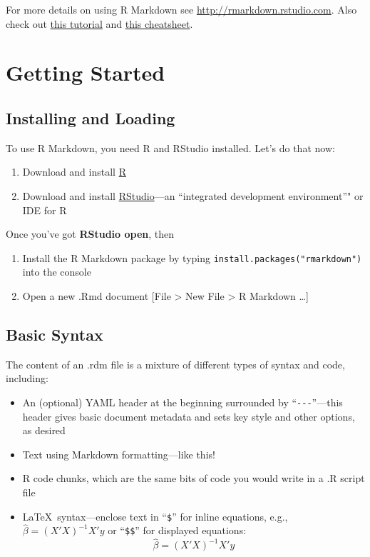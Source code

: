 \documentclass[11pt,]{article}
\providecommand{\tightlist}{%
  \setlength{\itemsep}{0pt}\setlength{\parskip}{0pt}}
\begin{document}
For more details on using R Markdown see
\url{http://rmarkdown.rstudio.com}. Also check out
\href{http://rmarkdown.rstudio.com/lesson-1.html}{this tutorial} and
\href{https://www.rstudio.com/wp-content/uploads/2016/03/rmarkdown-cheatsheet-2.0.pdf}{this
cheatsheet}.

\hypertarget{getting-started}{%
\section{Getting Started}\label{getting-started}}

\hypertarget{installing-and-loading}{%
\subsection{Installing and Loading}\label{installing-and-loading}}

To use R Markdown, you need R and RStudio installed. Let's do that now:

\begin{enumerate}
\def\labelenumi{\arabic{enumi}.}
\tightlist
\item
  Download and install \href{https://cran.rstudio.com/}{R}
\item
  Download and install
  \href{https://www.rstudio.com/products/rstudio/download/}{RStudio}---an
  ``integrated development environment''" or IDE for R
\end{enumerate}

Once you've got \textbf{RStudio open}, then

\begin{enumerate}
\def\labelenumi{\arabic{enumi}.}
\setcounter{enumi}{2}
\tightlist
\item
  Install the R Markdown package by typing
  \texttt{install.packages("rmarkdown")} into the console
\item
  Open a new .Rmd document {[}File \textgreater{} New File
  \textgreater{} R Markdown \ldots{}{]}
\end{enumerate}

\hypertarget{basic-syntax}{%
\subsection{Basic Syntax}\label{basic-syntax}}

The content of an .rdm file is a mixture of different types of syntax
and code, including:

\begin{itemize}
\tightlist
\item
  An (optional) YAML header at the beginning surrounded by
  ``\texttt{-\/-\/-}''---this header gives basic document metadata and
  sets key style and other options, as desired
\item
  Text using Markdown formatting---like this!
\item
  R code chunks, which are the same bits of code you would write in a .R
  script file
\item
  \LaTeX~syntax---enclose text in ``\texttt{\$}'' for inline equations,
  e.g., \(\hat \beta = (X'X)^{-1}X'y\) or ``\texttt{\$\$}'' for
  displayed equations: \[\hat \beta = (X'X)^{-1}X'y \]
\end{itemize}
\end{document}
